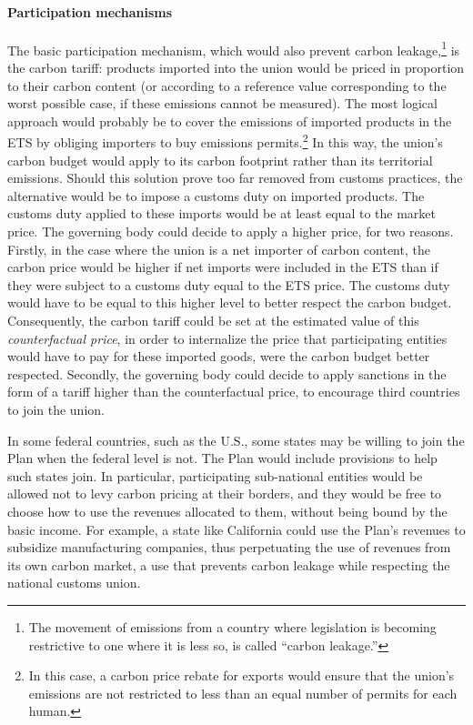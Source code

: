 \documentclass[a5paper,english,openany]{memoir}
\begin{document}
\paragraph{Participation mechanisms}

The basic participation mechanism, which would also prevent carbon leakage,\footnote{The movement of emissions from a country where legislation is becoming restrictive to one where it is less so, is called ``carbon leakage.''} is the carbon tariff: %
products imported into the union would be priced in proportion to their carbon content (or according to a reference value corresponding to the worst possible case, if these emissions cannot be measured). %
The most logical approach would probably be to cover the emissions of imported products in the ETS by obliging importers to buy emissions permits.\footnote{In this case, a carbon price rebate for exports would ensure that the union's emissions are not restricted to less than an equal number of permits for each human.} In this way, the union's carbon budget would apply to its carbon footprint rather than its territorial emissions. Should this solution prove too far removed from customs practices, the alternative would be to impose a customs duty on imported products. The customs duty applied to these imports would be at least equal to the market price. The governing body could decide to apply a higher price, for two reasons. Firstly, in the case where the union is a net importer of carbon content, the carbon price would be higher if net imports were included in the ETS than if they were subject to a customs duty equal to the ETS price. The customs duty would have to be equal to this higher level to better respect the carbon budget. Consequently, the carbon tariff could be set at the estimated value %
of this \textit{counterfactual price}, in order to internalize %
the price that participating entities would have to pay for these imported goods, were the carbon budget better respected. Secondly, the governing body could decide to apply sanctions in the form of a tariff higher than the counterfactual price, to encourage third countries to join the union. 

In some federal countries, such as the U.S., %
some states may be willing to join the Plan when the federal level is not. The Plan would include provisions to help such states join. In particular, participating sub-national entities would be allowed not to levy carbon pricing at their borders, and they would be free to choose how to use the revenues allocated to them, without being bound by the basic income. 
For example, a state like California could use the Plan's revenues to subsidize %
manufacturing companies, thus perpetuating the use of revenues from its own carbon market, a use that prevents carbon leakage while respecting the national customs union.
\end{document}
